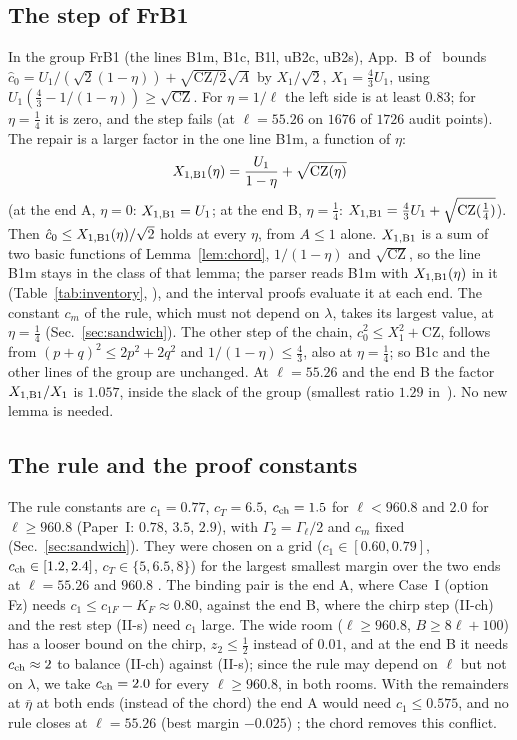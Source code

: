 \subsection{The step of FrB1}
In the group FrB1 (the lines B1m, B1c, B1l, uB2c, uB2s), App.~B of~\cite{I} bounds $\hat c_0=U_1/(\sqrt2(1-\eta))+\sqrt{\mathrm{CZ}/2}\sqrt A$ by $X_1/\sqrt2$, $X_1=\tfrac43U_1$, using $U_1(\tfrac43-1/(1-\eta))\ge\sqrt{\mathrm{CZ}}$.
For $\eta=1/\ell$ the left side is at least $0.83$; for $\eta=\tfrac14$ it is zero, and the step fails (at $\ell=55.26$ on $1676$ of $1726$ audit points).
The repair is a larger factor in the one line B1m, a function of $\eta$:
\begin{equation}
X_{1,\rm B1}(\eta)=\frac{U_1}{1-\eta}+\sqrt{\mathrm{CZ}(\eta)}
\end{equation}
(at the end A, $\eta=0$: $X_{1,\rm B1}=U_1$; at the end B, $\eta=\tfrac14$: $X_{1,\rm B1}=\tfrac43U_1+\sqrt{\mathrm{CZ}(\tfrac14)}$).
Then $\hat c_0\le X_{1,\rm B1}(\eta)/\sqrt2$ holds at every $\eta$, from $A\le1$ alone.
$X_{1,\rm B1}$ is a sum of two basic functions of Lemma~\ref{lem:chord}, $1/(1-\eta)$ and $\sqrt{\mathrm{CZ}}$, so the line B1m stays in the class of that lemma; the parser reads B1m with $X_{1,\rm B1}(\eta)$ in it (Table~\ref{tab:inventory}, ), and the interval proofs evaluate it at each end.
The constant $c_m$ of the rule, which must not depend on $\lambda$, takes its largest value, at $\eta=\tfrac14$ (Sec.~\ref{sec:sandwich}).
The other step of the chain, $\hat c_0^2\le X_1^2+\mathrm{CZ}$, follows from $(p+q)^2\le2p^2+2q^2$ and $1/(1-\eta)\le\tfrac43$, also at $\eta=\tfrac14$; so B1c and the other lines of the group are unchanged.
At $\ell=55.26$ and the end B the factor $X_{1,\rm B1}/X_1$ is $1.057$, inside the slack of the group (smallest ratio $1.29$ in~\cite{I}).
No new lemma is needed.

\subsection{The rule and the proof constants}
The rule constants are $c_1=0.77$, $c_T=6.5$, $c_{\rm ch}=1.5$ for $\ell<960.8$ and $2.0$ for $\ell\ge960.8$ (Paper~I: $0.78$, $3.5$, $2.9$), with $\Gamma_2=\Gamma_\ell/2$ and $c_m$ fixed (Sec.~\ref{sec:sandwich}).
They were chosen on a grid ($c_1\in[0.60,0.79]$, $c_{\rm ch}\in[1.2,2.4]$, $c_T\in\{5,6.5,8\}$) for the largest smallest margin over the two ends at $\ell=55.26$ and $960.8$ \numst.
The binding pair is the end A, where Case~I (option Fz) needs $c_1\le c_{1F}-K_F\approx0.80$, against the end B, where the chirp step (II-ch) and the rest step (II-s) need $c_1$ large.
The wide room ($\ell\ge960.8$, $B\ge8\ell+100$) has a looser bound on the chirp, $z_2\le\tfrac12$ instead of $0.01$, and at the end B it needs $c_{\rm ch}\approx2$ to balance (II-ch) against (II-s); since the rule may depend on $\ell$ but not on $\lambda$, we take $c_{\rm ch}=2.0$ for every $\ell\ge960.8$, in both rooms.
With the remainders at $\bar\eta$ at both ends (instead of the chord) the end A would need $c_1\le0.575$, and no rule closes at $\ell=55.26$ (best margin $-0.025$) \numst; the chord removes this conflict.


